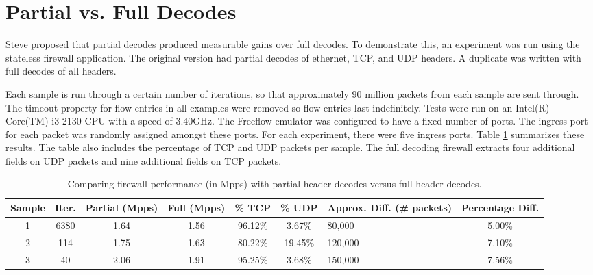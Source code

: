 \section{Partial vs. Full Decodes} \label{exp:decode_comparison}

Steve proposed that partial decodes produced measurable gains over full decodes. To demonstrate this, an experiment was run using the stateless firewall application. The original version had partial decodes of ethernet, TCP, and UDP headers. A duplicate was written with full decodes of all headers.

Each sample is run through a certain number of iterations, so that approximately 90 million packets from each sample are sent through.
The timeout property for flow entries in all examples were removed so flow entries last indefinitely. Tests were run on an Intel(R) Core(TM) i3-2130 CPU with a speed of 3.40GHz.
The Freeflow emulator was configured to have a fixed number of ports. The ingress port for each packet was randomly assigned amongst these ports. For each experiment, there were five ingress ports. 
Table \ref{tbl:firewall_cmp} summarizes these results. The table also includes the percentage of TCP and UDP packets per sample. The full decoding firewall extracts four additional fields on UDP packets and nine additional fields on TCP packets. 


\begin{table}[ht]
\caption{Comparing firewall performance (in Mpps) with partial header decodes versus full header decodes.}
\begin{center}
\begin{tabularx}{\linewidth}{| c || c | c | c | c | c | X | c |}
\hline
Sample & Iter. & Partial (Mpps) & Full (Mpps) & \% TCP & \% UDP & Approx. Diff. (\# packets) & Percentage Diff. \\
\hline
1 & 6380 & 1.64 & 1.56 & 96.12\% & 3.67\% & 80,000 & 5.00\% \\
\hline
2 & 114 & 1.75 & 1.63 & 80.22\% & 19.45\% & 120,000 & 7.10\% \\
\hline
3 & 40 & 2.06 & 1.91 & 95.25\% & 3.68\% & 150,000 & 7.56\% \\ 
\hline
\end{tabularx}
\end{center}
\label{tbl:firewall_cmp}
\end{table}


